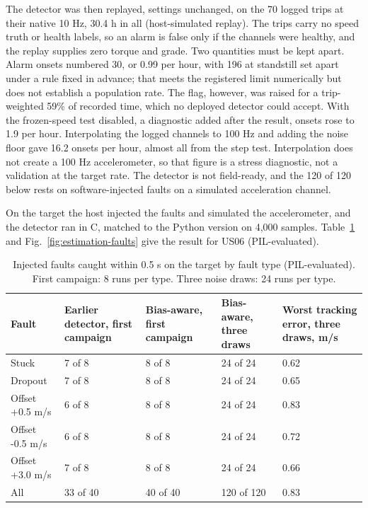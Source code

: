\documentclass{ieeeaccess}
\begin{document}
The detector was then replayed, settings unchanged, on the 70 logged trips at their native 10 Hz, 30.4 h in all (host-simulated replay). The trips carry no speed truth or health labels, so an alarm is false only if the channels were healthy, and the replay supplies zero torque and grade. Two quantities must be kept apart. Alarm onsets numbered 30, or 0.99 per hour, with 196 at standstill set apart under a rule fixed in advance; that meets the registered limit numerically but does not establish a population rate. The flag, however, was raised for a trip-weighted 59\% of recorded time, which no deployed detector could accept. With the frozen-speed test disabled, a diagnostic added after the result, onsets rose to 1.9 per hour. Interpolating the logged channels to 100 Hz and adding the noise floor gave 16.2 onsets per hour, almost all from the step test. Interpolation does not create a 100 Hz accelerometer, so that figure is a stress diagnostic, not a validation at the target rate. The detector is not field-ready, and the 120 of 120 below rests on software-injected faults on a simulated acceleration channel.

On the target the host injected the faults and simulated the accelerometer, and the detector ran in C, matched to the Python version on 4,000 samples. Table~\ref{tab:estimation-faults} and Fig.~\ref{fig:estimation-faults} give the result for US06 (PIL-evaluated).

\begin{table}[!t]
\centering
\caption{Injected faults caught within 0.5 s on the target by fault type (PIL-evaluated). First campaign: 8 runs per type. Three noise draws: 24 runs per type.}
\label{tab:estimation-faults}
\footnotesize
\setlength{\tabcolsep}{3pt}
\renewcommand{\arraystretch}{1.15}
\begin{tabularx}{\textwidth}{@{}XXXXX@{}}
\hline
\textbf{Fault} & \textbf{Earlier detector, first campaign} & \textbf{Bias-aware, first campaign} & \textbf{Bias-aware, three draws} & \textbf{Worst tracking error, three draws, m/s} \\
\hline
Stuck & 7 of 8 & 8 of 8 & 24 of 24 & 0.62 \\
Dropout & 7 of 8 & 8 of 8 & 24 of 24 & 0.65 \\
Offset +0.5 m/s & 6 of 8 & 8 of 8 & 24 of 24 & 0.83 \\
Offset -0.5 m/s & 6 of 8 & 8 of 8 & 24 of 24 & 0.72 \\
Offset +3.0 m/s & 7 of 8 & 8 of 8 & 24 of 24 & 0.66 \\
All & 33 of 40 & 40 of 40 & 120 of 120 & 0.83 \\
\hline
\end{tabularx}
\end{table}
\end{document}
